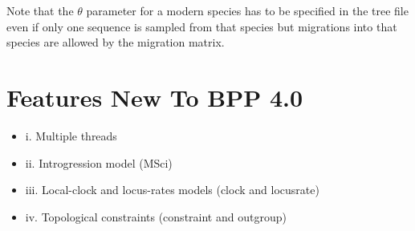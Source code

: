\documentclass[a4paper]{book}
\numberwithin{equation}{section} \renewcommand{\baselinestretch}{0.55}
\begin{document}
Note that the $\theta$ parameter for a modern species has to be
specified in the tree file even if only one sequence is sampled from
that species but migrations into that species are allowed by the
migration matrix.


\section{Features New To BPP 4.0}

\begin{itemize}
\item i.  Multiple threads
\item ii.  Introgression model (MSci)
\item iii. Local-clock and locus-rates models (clock and locusrate)
\item iv.  Topological constraints (constraint and outgroup)
\end{itemize}



\newpage
 
\end{document}
